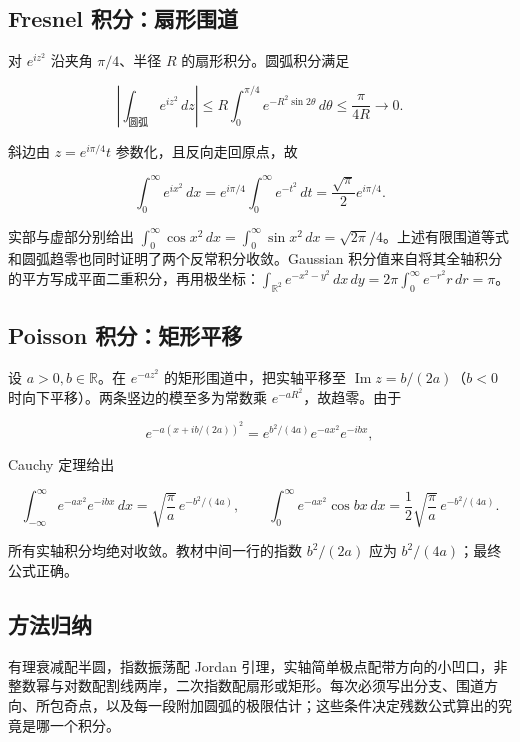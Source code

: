 \documentclass[11pt,a4paper]{article}
\begin{document}
\subsection{Fresnel 积分：扇形围道}\label{ch05-s5-heading-12}

对 \(e^{iz^2}\) 沿夹角 \(\pi/4\)、半径 \(R\) 的扇形积分。圆弧积分满足

\[
\left|\int_{\text{圆弧}}e^{iz^2}\,dz\right|
\le R\int_0^{\pi/4}e^{-R^2\sin2\theta}\,d\theta
\le\frac{\pi}{4R}\longrightarrow0.
\]

斜边由 \(z=e^{i\pi/4}t\) 参数化，且反向走回原点，故

\[
\int_0^\infty e^{ix^2}\,dx=e^{i\pi/4}\int_0^\infty e^{-t^2}\,dt
=\frac{\sqrt\pi}{2}e^{i\pi/4}.
\]

实部与虚部分别给出
\(\int_0^\infty\cos x^2\,dx=\int_0^\infty\sin x^2\,dx=\sqrt{2\pi}/4\)。上述有限围道等式和圆弧趋零也同时证明了两个反常积分收敛。Gaussian
积分值来自将其全轴积分的平方写成平面二重积分，再用极坐标：\(\int_{\mathbb R^2}e^{-x^2-y^2}\,dx\,dy=2\pi\int_0^\infty e^{-r^2}r\,dr=\pi\)。

\subsection{Poisson 积分：矩形平移}\label{ch05-s5-heading-13}

设 \(a>0,b\in\mathbb R\)。在 \(e^{-az^2}\) 的矩形围道中，把实轴平移至
\(\operatorname{Im}z=b/(2a)\)（\(b<0\)
时向下平移）。两条竖边的模至多为常数乘 \(e^{-aR^2}\)，故趋零。由于

\[
e^{-a(x+ib/(2a))^2}=e^{b^2/(4a)}e^{-ax^2}e^{-ibx},
\]

Cauchy 定理给出

\[
\int_{-\infty}^{\infty}e^{-ax^2}e^{-ibx}\,dx
=\sqrt{\frac\pi a}\,e^{-b^2/(4a)},\qquad
\int_0^\infty e^{-ax^2}\cos bx\,dx
=\frac12\sqrt{\frac\pi a}\,e^{-b^2/(4a)}.
\]

所有实轴积分均绝对收敛。教材中间一行的指数 \(b^2/(2a)\) 应为
\(b^2/(4a)\)；最终公式正确。

\subsection{方法归纳}\label{ch05-s5-heading-14}

有理衰减配半圆，指数振荡配 Jordan
引理，实轴简单极点配带方向的小凹口，非整数幂与对数配割线两岸，二次指数配扇形或矩形。每次必须写出分支、围道方向、所包奇点，以及每一段附加圆弧的极限估计；这些条件决定残数公式算出的究竟是哪一个积分。
\end{document}
